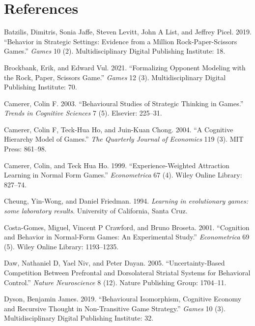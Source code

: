 \documentclass[smallextended]{svjour3}       %
\begin{document}
\hypertarget{references}{%
\section*{References}\label{references}}

\hypertarget{refs}{}
\leavevmode\hypertarget{ref-batzilis2019behavior}{}%
Batzilis, Dimitris, Sonia Jaffe, Steven Levitt, John A List, and Jeffrey
Picel. 2019. ``Behavior in Strategic Settings: Evidence from a Million
Rock-Paper-Scissors Games.'' \emph{Games} 10 (2). Multidisciplinary
Digital Publishing Institute: 18.

\leavevmode\hypertarget{ref-brockbank2021formalizing}{}%
Brockbank, Erik, and Edward Vul. 2021. ``Formalizing Opponent Modeling
with the Rock, Paper, Scissors Game.'' \emph{Games} 12 (3).
Multidisciplinary Digital Publishing Institute: 70.

\leavevmode\hypertarget{ref-camerer2003behavioural}{}%
Camerer, Colin F. 2003. ``Behavioural Studies of Strategic Thinking in
Games.'' \emph{Trends in Cognitive Sciences} 7 (5). Elsevier: 225--31.

\leavevmode\hypertarget{ref-camerer2004cognitive}{}%
Camerer, Colin F, Teck-Hua Ho, and Juin-Kuan Chong. 2004. ``A Cognitive
Hierarchy Model of Games.'' \emph{The Quarterly Journal of Economics}
119 (3). MIT Press: 861--98.

\leavevmode\hypertarget{ref-camerer1999experience}{}%
Camerer, Colin, and Teck Hua Ho. 1999. ``Experience-Weighted Attraction
Learning in Normal Form Games.'' \emph{Econometrica} 67 (4). Wiley
Online Library: 827--74.

\leavevmode\hypertarget{ref-cheung1994learning}{}%
Cheung, Yin-Wong, and Daniel Friedman. 1994. \emph{Learning in
evolutionary games: some laboratory results}. University of California,
Santa Cruz.

\leavevmode\hypertarget{ref-costa2001cognition}{}%
Costa-Gomes, Miguel, Vincent P Crawford, and Bruno Broseta. 2001.
``Cognition and Behavior in Normal-Form Games: An Experimental Study.''
\emph{Econometrica} 69 (5). Wiley Online Library: 1193--1235.

\leavevmode\hypertarget{ref-daw2005uncertainty}{}%
Daw, Nathaniel D, Yael Niv, and Peter Dayan. 2005. ``Uncertainty-Based
Competition Between Prefrontal and Dorsolateral Striatal Systems for
Behavioral Control.'' \emph{Nature Neuroscience} 8 (12). Nature
Publishing Group: 1704--11.

\leavevmode\hypertarget{ref-dyson2019behavioural}{}%
Dyson, Benjamin James. 2019. ``Behavioural Isomorphism, Cognitive
Economy and Recursive Thought in Non-Transitive Game Strategy.''
\emph{Games} 10 (3). Multidisciplinary Digital Publishing Institute: 32.
\end{document}
